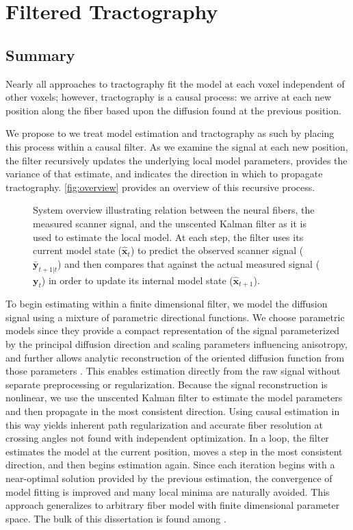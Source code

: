 \documentclass[final,hyperref]{gatech-thesis}
\renewcommand{\v}[1]{\ensuremath{\mathbf #1}\xspace}
\newcommand{\x}{\v x}
\newcommand{\y}{\v y}
\begin{document}
\chapter{Filtered Tractography}

\section{Summary}

Nearly all approaches to tractography fit the model at each voxel independent
of other voxels; however, tractography is a causal process: we arrive at each
new position along the fiber based upon the diffusion found at the previous
position.

We propose to we treat model estimation and tractography as such by placing
this process within a causal filter.
%
As we examine the signal at each new position, the filter recursively updates
the underlying local model parameters, provides the variance of that estimate,
and indicates the direction in which to propagate tractography.
\autoref{fig:overview} provides an overview of this recursive process.
\begin{figure}[t]
  \centering
  \resizebox{!}{1.8in}{}
  \caption{System overview illustrating relation between the neural fibers,
    the measured scanner signal, and the unscented Kalman filter as it is used
    to estimate the local model.  At each step, the filter uses its current
    model state ($\hat{\x}_t$) to predict the observed scanner signal
    ($\bar{\y}_{t+1|t}$) and then compares that against the actual measured
    signal ($\y_t$) in order to update its internal model state
    ($\hat{\x}_{t+1}$).}
  \label{fig:overview}
\end{figure}

To begin estimating within a finite dimensional filter, we model the diffusion
signal using a mixture of parametric directional functions.  We choose
parametric models since they provide a compact representation of the signal
parameterized by the principal diffusion direction and scaling parameters
influencing anisotropy, and further allows analytic reconstruction of the
oriented diffusion function from those parameters
\cite{malcolm2010tmi,Rathi2009mia_w}.  This enables estimation directly from
the raw signal without separate preprocessing or regularization.
%
Because the signal reconstruction is nonlinear, we use the unscented Kalman
filter to estimate the model parameters and then propagate in the most
consistent direction.
%
Using causal estimation in this way yields inherent path regularization and
accurate fiber resolution at crossing angles not found with independent
optimization.  In a loop, the filter estimates the model at the current
position, moves a step in the most consistent direction, and then begins
estimation again.
%
Since each iteration begins with a near-optimal solution provided by the
previous estimation, the convergence of model fitting is improved and many
local minima are naturally avoided.
%
This approach generalizes to arbitrary fiber model with finite dimensional
parameter space.  The bulk of this dissertation is found among
\cite{malcolm2010tmi,Malcolm2009ipmi,malcolm2009cukf}.
\end{document}
